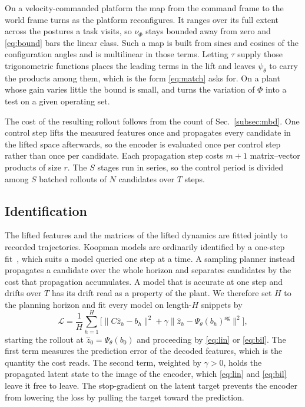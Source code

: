\documentclass[letterpaper,10pt,conference]{ieeeconf}
\begin{document}
On a velocity-commanded platform the map from the command frame to the world frame turns as the platform reconfigures.
It ranges over its full extent across the postures a task visits, so $\nu_\Phi$ stays bounded away from zero and \eqref{eq:bound} bars the linear class.
Such a map is built from sines and cosines of the configuration angles and is multilinear in those terms.
Letting $\tau$ supply those trigonometric functions places the leading terms in the lift and leaves $\psi_\theta$ to carry the products among them, which is the form \eqref{eq:match} asks for.
On a plant whose gain varies little the bound is small, and \cite{kim2026bilinear} turns the variation of $\Phi$ into a test on a given operating set.

The cost of the resulting rollout follows from the count of Sec.~\ref{subsec:mbd}.
One control step lifts the measured features once and propagates every candidate in the lifted space afterwards, so the encoder is evaluated once per control step rather than once per candidate.
Each propagation step costs $m+1$ matrix--vector products of size $r$.
The $S$ stages run in series, so the control period is divided among $S$ batched rollouts of $N$ candidates over $T$ steps.

\subsection{Identification}\label{subsec:training}

The lifted features and the matrices of the lifted dynamics are fitted jointly to recorded trajectories.
Koopman models are ordinarily identified by a one-step fit~\cite{lusch2018deep}, which suits a model queried one step at a time.
A sampling planner instead propagates a candidate over the whole horizon and separates candidates by the cost that propagation accumulates.
A model that is accurate at one step and drifts over $T$ has its drift read as a property of the plant.
We therefore set $H$ to the planning horizon and fit every model on length-$H$ snippets by
\begin{equation}
\mathcal{L} = \frac{1}{H} \sum_{h=1}^{H}
\Big[ \big\| C \hat{z}_h - b_h \big\|^{2}
+ \gamma \big\| \hat{z}_h - \Psi_\theta(b_h)^{\mathrm{sg}} \big\|^{2} \Big] ,
\label{eq:loss}
\end{equation}
starting the rollout at $\hat z_0 = \Psi_\theta(b_0)$ and proceeding by \eqref{eq:lin} or \eqref{eq:bil}.
The first term measures the prediction error of the decoded features, which is the quantity the cost reads.
The second term, weighted by $\gamma > 0$, holds the propagated latent state to the image of the encoder, which \eqref{eq:lin} and \eqref{eq:bil} leave it free to leave.
The stop-gradient on the latent target prevents the encoder from lowering the loss by pulling the target toward the prediction.
\end{document}
